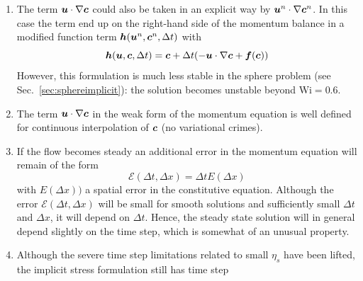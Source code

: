 \begin{enumerate}
\begin{multline}
   \ldots + \Big(\vek v,p\vec n-\vek n\cdot\big(G\Delta t(-\vek u^{n+1}\cdot\nabla\ten c^n+
        \nabla\vek u^{n+1}{}^T\cdot\ten c^n+
      \ten c^n\cdot\nabla \vek u^{n+1})\big)\Big)_{\Gamma_\text{open}}=\\
        \big(\vek v,\vek n\cdot( G\ten h(\ten c^n,\Delta t) -G\ten 1)\big)_{\Gamma_\text{open}} + \dots
\end{multline}
where $\vek n$ is the outwardly directed normal on $\Gamma_\text{open}$.
   \item The term $\boldsymbol{u}\cdot\nabla\boldsymbol{c}$ could also be taken in an explicit
         way by $\boldsymbol{u}^n\cdot\nabla\boldsymbol{c}^n$. In this case the term end up on
         the right-hand side of the momentum balance in a modified function 
         term $\boldsymbol{h}(\boldsymbol{u}^n,\boldsymbol{c}^n, \Delta t)$ with
\begin{equation}
 \boldsymbol{h}(\boldsymbol{u},\boldsymbol{c}, \Delta t)=
\boldsymbol{c}+\Delta t(-\boldsymbol{u}\cdot\nabla\boldsymbol{c}+\boldsymbol{f}(\boldsymbol{c}))
\end{equation}
         However, this formulation is much less stable in the sphere problem
         (see Sec.~\ref{sec:sphereimplicit}): the solution becomes unstable
         beyond $\text{Wi}=0.6$.
   \item The term $\boldsymbol{u}\cdot\nabla\boldsymbol{c}$ in the weak form of
         the momentum equation is well defined for continuous interpolation of
         $\boldsymbol{c}$ (no variational crimes).
   \item If the flow becomes steady an additional error in the
         momentum equation will remain of the form
         \begin{equation}
            \mathcal{E}(\Delta t,\Delta x)=\Delta tE(\Delta x)
         \end{equation}
         with $E(\Delta x))$ a spatial error in the constitutive equation.
         Although the error $\mathcal{E}(\Delta t,\Delta x)$ will be small 
         for smooth
         solutions and sufficiently small $\Delta t$ and $\Delta x$, it will
         depend on $\Delta t$. Hence, the steady state solution will in general
         depend slightly on the time step, which is somewhat of an unusual
         property.
   \item Although the severe time step limitations related to
         small $\eta_s$ have been
         lifted, the implicit stress formulation still has time step

\end{enumerate}
